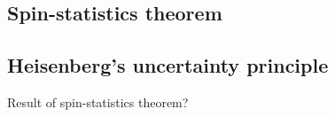 
\subsection{Spin-statistics theorem}

\subsection{Heisenberg's uncertainty principle}

Result of spin-statistics theorem?
